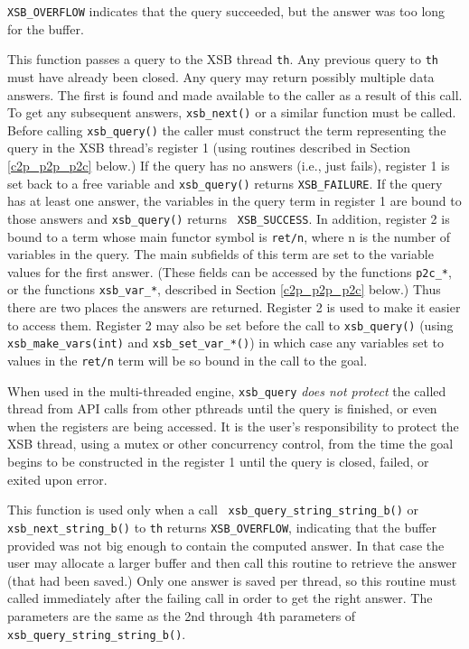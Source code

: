 \begin{description}
\item {\tt XSB\_OVERFLOW} indicates that the query succeeded, but the
  answer was too long for the buffer.
%
\ei

%
This function passes a query to the XSB thread {\tt th}.  Any previous
query to {\tt th} must have already been closed.  Any query may return
possibly multiple data answers.  The first is found and made available
to the caller as a result of this call.  To get any subsequent
answers, {\tt xsb\_next()} or a similar function must be called.
Before calling {\tt xsb\_query()} the caller must construct the term
representing the query in the XSB thread's register 1 (using routines
described in Section \ref{c2p_p2p_p2c} below.)  If the query has no
answers (i.e., just fails), register 1 is set back to a free variable
and {\tt xsb\_query()} returns {\tt XSB\_FAILURE}.  If the query has
at least one answer, the variables in the query term in register 1 are
bound to those answers and {\tt xsb\_query()} returns {\tt
  XSB\_SUCCESS}.  In addition, register 2 is bound to a term whose
main functor symbol is {\tt ret/n}, where n is the number of variables
in the query. The main subfields of this term are set to the variable
values for the first answer. (These fields can be accessed by the
functions {\tt p2c\_*}, or the functions {\tt xsb\_var\_*}, described
in Section \ref{c2p_p2p_p2c} below.)  Thus there are two places the
answers are returned. Register 2 is used to make it easier to access
them.  Register 2 may also be set before the call to {\tt xsb\_query()}
(using {\tt xsb\_make\_vars(int)} and {\tt xsb\_set\_var\_*()}) in
which case any variables set to values in the {\tt ret/n} term will be
so bound in the call to the goal.

When used in the multi-threaded engine, {\tt xsb\_query} {\em does not
  protect} the called thread from API calls from other pthreads until
the query is finished, or even when the registers are being accessed.
It is the user's responsibility to protect the XSB thread, using a
mutex or other concurrency control, from the time the goal begins to
be constructed in the register 1 until the query is closed, failed, or
exited upon error.

%
This function is used only when a call {\tt
  xsb\_query\_string\_string\_b()} or {\tt xsb\_next\_string\_b()} to
{\tt th} returns {\tt XSB\_OVERFLOW}, indicating that the buffer
provided was not big enough to contain the computed answer.  In that
case the user may allocate a larger buffer and then call this routine
to retrieve the answer (that had been saved.)  Only one answer is
saved per thread, so this routine must called immediately after the
failing call in order to get the right answer.  The parameters are the
same as the 2nd through 4th parameters of {\tt
  xsb\_query\_string\_string\_b()}.


\end{description}
